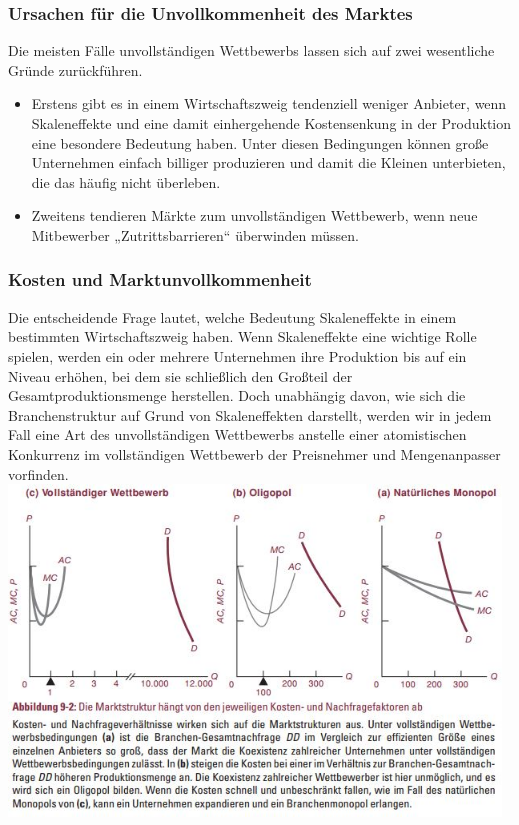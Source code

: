 \documentclass[10pt]{scrartcl}
\begin{document}
\subsubsection{Ursachen für die Unvollkommenheit des Marktes}
Die meisten Fälle unvollständigen Wettbewerbs lassen sich auf zwei wesentliche Gründe zurückführen.
\begin{itemize}
\item[] Erstens gibt es in einem Wirtschaftszweig tendenziell weniger Anbieter, wenn Skaleneffekte und eine damit einhergehende Kostensenkung in der Produktion eine besondere Bedeutung haben. Unter diesen Bedingungen können große Unternehmen einfach billiger produzieren und damit die Kleinen unterbieten, die das häufig nicht überleben.
\item[] Zweitens tendieren Märkte zum unvollständigen Wettbewerb, wenn neue Mitbewerber „Zutrittsbarrieren“ überwinden müssen.
\end{itemize}
\subsubsection{Kosten und Marktunvollkommenheit}
Die entscheidende Frage lautet, welche Bedeutung Skaleneffekte in einem bestimmten Wirtschaftszweig haben. Wenn Skaleneffekte eine wichtige Rolle spielen, werden ein oder mehrere Unternehmen ihre Produktion bis auf ein Niveau erhöhen, bei dem sie schließlich den Großteil der Gesamtproduktionsmenge herstellen. Doch unabhängig davon, wie sich die Branchenstruktur auf Grund von Skaleneffekten darstellt, werden wir in jedem Fall eine Art des unvollständigen Wettbewerbs anstelle einer atomistischen Konkurrenz im  vollständigen Wettbewerb der Preisnehmer und Mengenanpasser vorfinden.
\\
\includegraphics[width=0.98\textwidth]{img/wettbewerb_vergleich.jpg}
\end{document}
